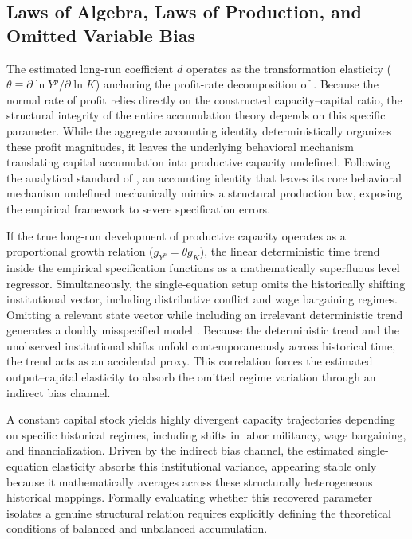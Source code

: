\documentclass[11pt]{article}
\begin{document}
\subsection{Laws of Algebra, Laws of Production, and Omitted Variable Bias}

The estimated long-run coefficient $d$ operates as the transformation elasticity ($\theta \equiv \partial \ln Y^p / \partial \ln K$) anchoring the profit-rate decomposition of \citet{Shaikh2016}. Because the normal rate of profit relies directly on the constructed capacity--capital ratio, the structural integrity of the entire accumulation theory depends on this specific parameter. While the aggregate accounting identity deterministically organizes these profit magnitudes, it leaves the underlying behavioral mechanism translating capital accumulation into productive capacity undefined. Following the analytical standard of \citet{Shaikh1974}, an accounting identity that leaves its core behavioral mechanism undefined mechanically mimics a structural production law, exposing the empirical framework to severe specification errors.

If the true long-run development of productive capacity operates as a proportional growth relation ($g_{Y^p} = \theta g_K$), the linear deterministic time trend inside the empirical specification functions as a mathematically superfluous level regressor. Simultaneously, the single-equation setup omits the historically shifting institutional vector, including distributive conflict and wage bargaining regimes. Omitting a relevant state vector while including an irrelevant deterministic trend generates a doubly misspecified model \citep{Basu2020}. Because the deterministic trend and the unobserved institutional shifts unfold contemporaneously across historical time, the trend acts as an accidental proxy. This correlation forces the estimated output--capital elasticity to absorb the omitted regime variation through an indirect bias channel.

A constant capital stock yields highly divergent capacity trajectories depending on specific historical regimes, including shifts in labor militancy, wage bargaining, and financialization. Driven by the indirect bias channel, the estimated single-equation elasticity absorbs this institutional variance, appearing stable only because it mathematically averages across these structurally heterogeneous historical mappings. Formally evaluating whether this recovered parameter isolates a genuine structural relation requires explicitly defining the theoretical conditions of balanced and unbalanced accumulation.
\end{document}
